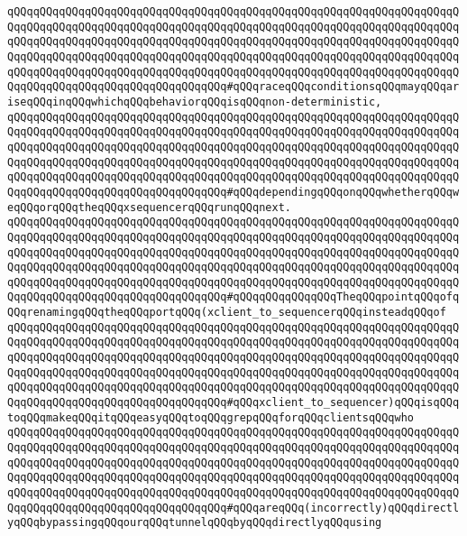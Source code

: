 \verb|qQQqqQQqqQQqqQQqqQQqqQQqqQQqqQQqqQQqqQQqqQQqqQQqqQQqqQQqqQQqqQQqqQQqqQQqqQQqqQQqqQQqqQQqqQQqqQQqqQQqqQQqqQQqqQQqqQQqqQQqqQQqqQQqqQQqqQQqqQQqqQQqqQQqqQQqqQQqqQQqqQQqqQQqqQQqqQQqqQQqqQQqqQQqqQQqqQQqqQQqqQQqqQQqqQQqqQQqqQQqqQQqqQQqqQQqqQQqqQQqqQQqqQQqqQQqqQQqqQQqqQQqqQQqqQQqqQQqqQQqqQQqqQQqqQQqqQQqqQQqqQQqqQQqqQQqqQQqqQQqqQQqqQQqqQQqqQQqqQQqqQQqqQQqqQQqqQQqqQQqqQQqqQQqqQQqqQQqqQQqqQQq#qQQqraceqQQqconditionsqQQqmayqQQqariseqQQqinqQQqwhichqQQqbehaviorqQQqisqQQqnon-deterministic,|\newline
\verb|qQQqqQQqqQQqqQQqqQQqqQQqqQQqqQQqqQQqqQQqqQQqqQQqqQQqqQQqqQQqqQQqqQQqqQQqqQQqqQQqqQQqqQQqqQQqqQQqqQQqqQQqqQQqqQQqqQQqqQQqqQQqqQQqqQQqqQQqqQQqqQQqqQQqqQQqqQQqqQQqqQQqqQQqqQQqqQQqqQQqqQQqqQQqqQQqqQQqqQQqqQQqqQQqqQQqqQQqqQQqqQQqqQQqqQQqqQQqqQQqqQQqqQQqqQQqqQQqqQQqqQQqqQQqqQQqqQQqqQQqqQQqqQQqqQQqqQQqqQQqqQQqqQQqqQQqqQQqqQQqqQQqqQQqqQQqqQQqqQQqqQQqqQQqqQQqqQQqqQQqqQQqqQQqqQQqqQQqqQQqqQQq#qQQqdependingqQQqonqQQqwhetherqQQqweqQQqorqQQqtheqQQqxsequencerqQQqrunqQQqnext.|\newline
\verb|qQQqqQQqqQQqqQQqqQQqqQQqqQQqqQQqqQQqqQQqqQQqqQQqqQQqqQQqqQQqqQQqqQQqqQQqqQQqqQQqqQQqqQQqqQQqqQQqqQQqqQQqqQQqqQQqqQQqqQQqqQQqqQQqqQQqqQQqqQQqqQQqqQQqqQQqqQQqqQQqqQQqqQQqqQQqqQQqqQQqqQQqqQQqqQQqqQQqqQQqqQQqqQQqqQQqqQQqqQQqqQQqqQQqqQQqqQQqqQQqqQQqqQQqqQQqqQQqqQQqqQQqqQQqqQQqqQQqqQQqqQQqqQQqqQQqqQQqqQQqqQQqqQQqqQQqqQQqqQQqqQQqqQQqqQQqqQQqqQQqqQQqqQQqqQQqqQQqqQQqqQQqqQQqqQQqqQQqqQQqqQQq#qQQqqQQqqQQqqQQqTheqQQqpointqQQqofqQQqrenamingqQQqtheqQQqportqQQq(xclient_to_sequencerqQQqinsteadqQQqof|\newline
\verb|qQQqqQQqqQQqqQQqqQQqqQQqqQQqqQQqqQQqqQQqqQQqqQQqqQQqqQQqqQQqqQQqqQQqqQQqqQQqqQQqqQQqqQQqqQQqqQQqqQQqqQQqqQQqqQQqqQQqqQQqqQQqqQQqqQQqqQQqqQQqqQQqqQQqqQQqqQQqqQQqqQQqqQQqqQQqqQQqqQQqqQQqqQQqqQQqqQQqqQQqqQQqqQQqqQQqqQQqqQQqqQQqqQQqqQQqqQQqqQQqqQQqqQQqqQQqqQQqqQQqqQQqqQQqqQQqqQQqqQQqqQQqqQQqqQQqqQQqqQQqqQQqqQQqqQQqqQQqqQQqqQQqqQQqqQQqqQQqqQQqqQQqqQQqqQQqqQQqqQQqqQQqqQQqqQQqqQQqqQQqqQQq#qQQqxclient_to_sequencer)qQQqisqQQqtoqQQqmakeqQQqitqQQqeasyqQQqtoqQQqgrepqQQqforqQQqclientsqQQqwho|\newline
\verb|qQQqqQQqqQQqqQQqqQQqqQQqqQQqqQQqqQQqqQQqqQQqqQQqqQQqqQQqqQQqqQQqqQQqqQQqqQQqqQQqqQQqqQQqqQQqqQQqqQQqqQQqqQQqqQQqqQQqqQQqqQQqqQQqqQQqqQQqqQQqqQQqqQQqqQQqqQQqqQQqqQQqqQQqqQQqqQQqqQQqqQQqqQQqqQQqqQQqqQQqqQQqqQQqqQQqqQQqqQQqqQQqqQQqqQQqqQQqqQQqqQQqqQQqqQQqqQQqqQQqqQQqqQQqqQQqqQQqqQQqqQQqqQQqqQQqqQQqqQQqqQQqqQQqqQQqqQQqqQQqqQQqqQQqqQQqqQQqqQQqqQQqqQQqqQQqqQQqqQQqqQQqqQQqqQQqqQQqqQQqqQQq#qQQqareqQQq(incorrectly)qQQqdirectlyqQQqbypassingqQQqourqQQqtunnelqQQqbyqQQqdirectlyqQQqusing|\newline
